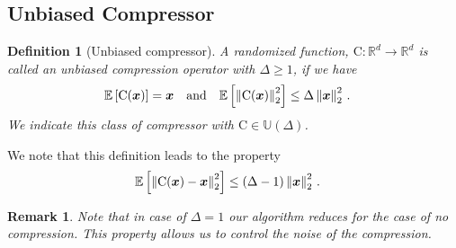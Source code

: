 \documentclass{article}
\newtheorem{definition}{Definition}
\newtheorem{remark}{Remark}
\begin{document}
\subsection{Unbiased Compressor}
\begin{definition}[Unbiased compressor]
A randomized function, $\text{C}:\mathbb{R}^{d}\rightarrow\mathbb{R}^{d}$ is called an unbiased compression operator with $\Delta\geq 1$, if we have 
\begin{align}\notag
\mathbb{E}\left[\text{C}(\boldsymbol{x})\right]&=\boldsymbol{x}\nonumber \quad \textrm{and} \quad    \mathbb{E}\left[\left\|\text{C}(\boldsymbol{x})\right\|^2_2\right] \leq \Delta\left\|\boldsymbol{x}\right\|^2_2\notag \, .
\end{align}
We indicate this class of compressor with $\text{C}\in\mathbb{U}(\Delta)$.
\end{definition}
We note that this definition leads to the property 
\begin{align}\notag
    \mathbb{E}\left[\left\|\text{C}(\boldsymbol{x})-\boldsymbol{x}\right\|^2_2\right]&\leq \left(\Delta-1\right)\left\|\boldsymbol{x}\right\|^2_2\, .
\end{align}
\begin{remark}
Note that in case of $\Delta=1$ our algorithm reduces for the case of no compression. This property allows us to control the noise of the compression.
\end{remark}
\begin{algorithm}[H]
\caption{\texttt{PRIVIX}\cite{li2019privacy}: Unbiased compressor based on sketching. }\label{Alg:privix}
\begin{algorithmic}[1]
\vspace{- 0.1cm}
\end{algorithmic}
\end{algorithm}
\end{document}
